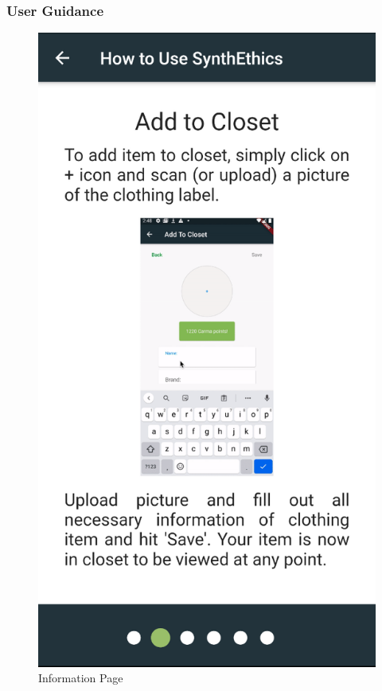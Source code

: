 \documentclass[a4paper, 11pt]{article}
\begin{document}
      \subsubsection{User Guidance}
      \begin{figure}
        \centering
        \includegraphics[scale=0.3]{home-info.png}
        \caption{Information Page}
      \end{figure}
\end{document}
